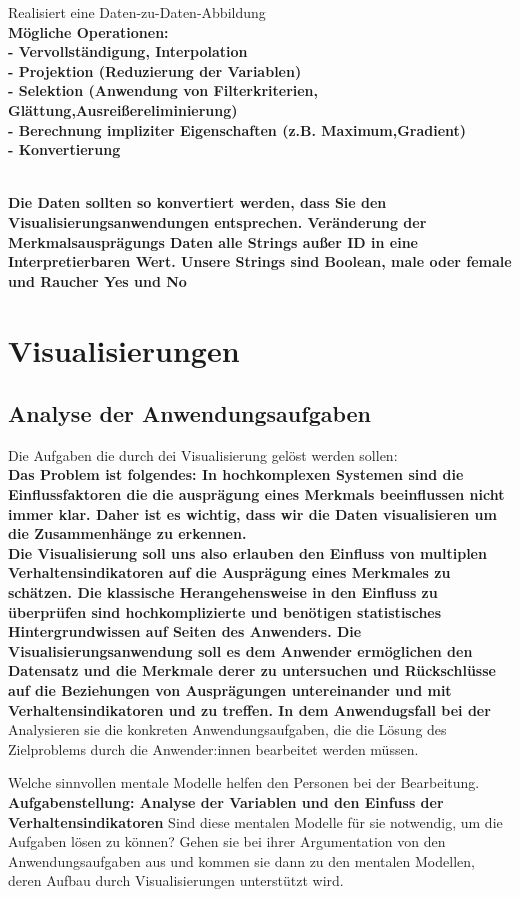 \documentclass[usegeometry=true]{scrartcl}
\begin{document}
 
  Realisiert eine Daten-zu-Daten-Abbildung\\
 \textbf{ Mögliche Operationen:\\
    - Vervollständigung, Interpolation\\
    - Projektion (Reduzierung der Variablen)\\
    - Selektion (Anwendung von Filterkriterien, Glättung,Ausreißereliminierung)\\
    - Berechnung impliziter Eigenschaften (z.B. Maximum,Gradient)\\
    - Konvertierung\\
    \\}

\textbf{ Die Daten sollten so konvertiert werden, dass Sie den Visualisierungsanwendungen entsprechen. Veränderung der Merkmalsausprägungs Daten alle Strings außer ID in eine Interpretierbaren Wert. Unsere Strings sind Boolean, male oder female und Raucher Yes und No }
   

\section{Visualisierungen}
\subsection{Analyse der Anwendungsaufgaben}
Die Aufgaben die durch dei Visualisierung gelöst werden sollen: \\ 
\textbf{ Das Problem ist folgendes: In hochkomplexen Systemen sind die Einflussfaktoren die die ausprägung eines Merkmals beeinflussen nicht immer klar. Daher ist es wichtig, dass wir die Daten visualisieren um die Zusammenhänge zu erkennen.\\
Die Visualisierung soll uns also erlauben den Einfluss von multiplen Verhaltensindikatoren auf die Ausprägung eines Merkmales zu schätzen. 
Die klassische Herangehensweise in den Einfluss zu überprüfen sind hochkomplizierte und benötigen
statistisches Hintergrundwissen auf Seiten des Anwenders. Die Visualisierungsanwendung soll es dem Anwender ermöglichen den Datensatz und die Merkmale derer zu untersuchen und Rückschlüsse auf die Beziehungen von Ausprägungen untereinander und mit Verhaltensindikatoren und zu treffen.
 In dem Anwendugsfall bei der  \\  }
Analysieren sie die konkreten Anwendungsaufgaben, die die Lösung des Zielproblems durch die Anwender:innen bearbeitet werden müssen. 

Welche sinnvollen mentale Modelle helfen den Personen bei der Bearbeitung. 
\textbf{Aufgabenstellung: Analyse der Variablen und den Einfuss der Verhaltensindikatoren}
Sind diese mentalen Modelle für sie notwendig, um die Aufgaben lösen zu können? 
Gehen sie bei ihrer Argumentation von den Anwendungsaufgaben aus und kommen sie dann zu den mentalen Modellen, deren Aufbau durch Visualisierungen unterstützt wird. 
\end{document}
